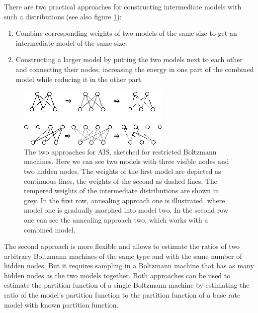 \documentclass[12pt]{article}
\begin{document}
There are two practical approaches for constructing intermediate models with such a distributions (see also figure \ref{figTwotypesais}):
\begin{enumerate}
\item Combine corresponding weights of two models of the same size to get an intermediate model of the same size.
\item Constructing a larger model by putting the two models next to each other and connecting their nodes, increasing the energy in one part of the combined model while reducing it in the other part. \citep{theis2011deepbelief}
\end{enumerate}
\begin{figure}[h!]
\centering
\includegraphics[scale=3.]{images/twotypesais.eps}
\caption{The two approaches for AIS, sketched for restricted Boltzmann machines.
Here we can see two models with three visible nodes and two hidden nodes. 
The weights of the first model are depicted as continuous lines, the weights of the second as dashed lines. The tempered weights of the intermediate distributions are shown in grey. In the first row, annealing approach one is illustrated, where model one is gradually morphed into model two. In the second row one can see the annealing approach two, which works with a combined model.}
\label{figTwotypesais}
\end{figure}
The second approach is more flexible and allows to estimate the ratios of two arbitrary Boltzmann machines of the same type and with the same number of hidden nodes. But it requires sampling in a Boltzmann machine that has as many hidden nodes as the two models together.
Both approaches can be used to estimate the partition function of a single Boltzmann machine by estimating the ratio of the model's partition function to the partition function of a base rate model with known partition function.
\end{document}
